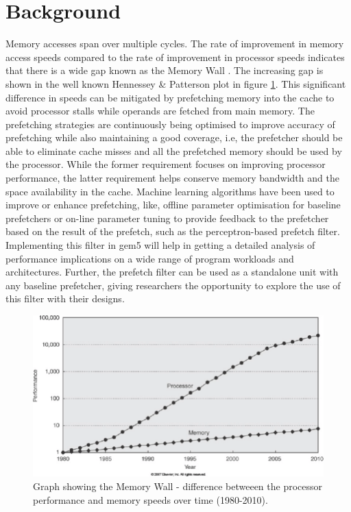 \documentclass[10pt,conference]{IEEEtran}
\begin{document}
\section{Background}
Memory accesses span over multiple cycles. The rate of improvement in memory access speeds compared to the rate of improvement in processor speeds indicates that there is a wide gap known as the Memory Wall \cite{mem-wall}. The increasing gap is shown in the well known Hennessey \& Patterson \cite{hennessey} plot in figure \ref{fig:memwall}. This significant difference in speeds can be mitigated by prefetching memory into the cache to avoid processor stalls while operands are fetched from main memory. The prefetching strategies are continuously being optimised to improve accuracy of prefetching while also maintaining a good coverage, i.e, the prefetcher should be able to eliminate cache misses and all the prefetched memory should be used by the processor. While the former requirement focuses on improving processor performance, the latter requirement helps conserve memory bandwidth and the space availability in the cache. Machine learning algorithms have been used to improve or enhance prefetching, like, offline parameter optimisation for baseline prefetchers or on-line parameter tuning to provide feedback to the prefetcher based on the result of the prefetch, such as the perceptron-based prefetch filter\cite{ppf}. Implementing this filter in gem5 will help in getting a detailed analysis of performance implications on a wide range of program workloads and architectures.  Further, the prefetch filter can be used as a standalone unit with any baseline prefetcher, giving researchers the opportunity to explore the use of this filter with their designs.

\begin{figure}
    \centering
    \includegraphics[width=\columnwidth]{Processor-memory-latency-divide-introducing-the-memory-wall-5.png}
    \caption{Graph showing the Memory Wall - difference betweeen the processor performance and memory speeds over time (1980-2010).}
    \label{fig:memwall}
\end{figure}
\end{document}
